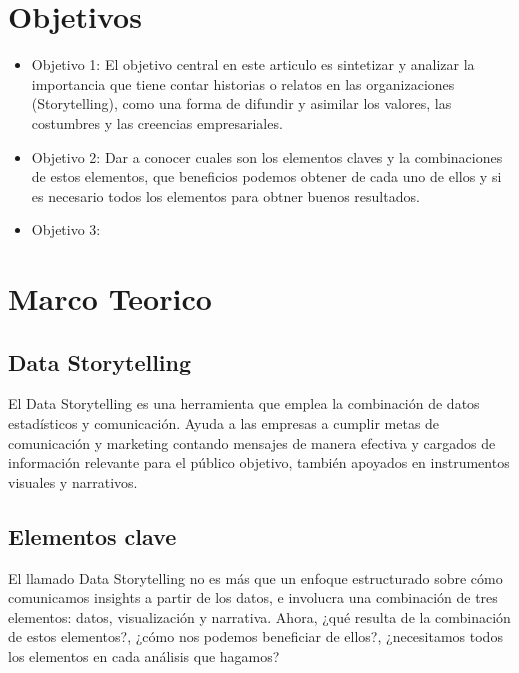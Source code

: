 \documentclass[preprint,12pt]{elsarticle}
\begin{document}
	

\section{Objetivos}
		\begin{itemize}
		\item Objetivo 1: El objetivo central en este articulo es sintetizar y analizar la importancia que tiene contar historias o relatos en las organizaciones (Storytelling), como una forma de difundir y asimilar los valores, las costumbres y las creencias empresariales.
		\item Objetivo 2: Dar a conocer cuales son los elementos claves y la combinaciones de estos elementos, que beneficios podemos obtener de cada uno de ellos y si es necesario todos los elementos para obtner buenos resultados.
		\item Objetivo 3: 
	\end{itemize}

	

\section{Marco Teorico}
	\label{S:1}
\subsection{Data Storytelling}	

	El Data Storytelling es una herramienta que emplea la combinación de datos estadísticos y comunicación. Ayuda a las empresas a cumplir metas de comunicación y marketing contando mensajes de manera efectiva y cargados de información relevante para el público objetivo, también apoyados en instrumentos visuales y narrativos.\\
		
	\subsection{Elementos clave}
	
	El llamado Data Storytelling no es más que un enfoque estructurado sobre cómo comunicamos insights a partir de los datos, e involucra una combinación de tres elementos: datos, visualización y narrativa.
Ahora, ¿qué resulta de la combinación de estos elementos?, ¿cómo nos podemos beneficiar de ellos?, ¿necesitamos todos los elementos en cada análisis que hagamos?\\
\end{document}
